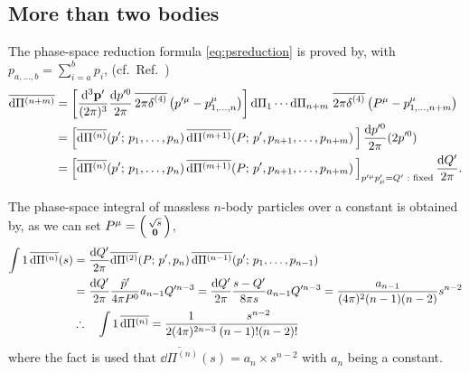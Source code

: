 \documentclass[CheatSheet]{subfiles}
\begin{document}
\subsection{More than two bodies}
The phase-space reduction formula \eqref{eq:psreduction} is proved by, with $p_{a,\dots,b}=\sum_{i=a}^b p_i$, (cf.~Ref.~\cite{Hitoshi233B})
\begin{align*}
  \overline{\dd\Pi^{(n+m)}}%
  &=\left[
    \ddP{p'}\frac{\dd p'^0}{2\pi}\diracdeltabar[4]\left(p'^\mu-p_{1,\dots,n}^\mu\right)
  \right]
  \dd\Pi_1\cdots\dd\Pi_{n+m}\,\diracdeltabar[4]\left(P^\mu-p_{1,\dots,n+m}^\mu\right)
\\ &=    \left[
    \overline{\dd\Pi^{(n)}}(p';\,p_1,\dots,p_n)\,
    \overline{\dd\Pi^{(m+1)}}(P;\,p',p_{n+1},\dots,p_{n+m})\,
  \right]
    \frac{\dd p'^0}{2\pi}(2p'^0)
\\ &=    \left[
    \overline{\dd\Pi^{(n)}}(p';\,p_1,\dots,p_n)\,
    \overline{\dd\Pi^{(m+1)}}(P;\,p',p_{n+1},\dots,p_{n+m})\,
  \right]_{p'^\mu p'_\mu=Q'\text{~:~fixed}}
    \frac{\dd Q'}{2\pi}.
\end{align*}

\pagebreak[3]

The phase-space integral of massless $n$-body particles over a constant is obtained by, as we can set $P^\mu=\left(\begin{smallmatrix}\sqrt{s}\\{\mathbf{0}}\end{smallmatrix}\right)$,
\begin{align}
\int1\,\overline{{\mathrm{d}}\Pi^{(n)}}(s)
&= \frac{{\mathrm{d}} Q'}{2\pi}
  \overline{{\mathrm{d}}\Pi^{(2)}}(P;\,p',p_{n})\,
  \overline{{\mathrm{d}}\Pi^{(n-1)}}(p';\,p_1,\dots,p_{n-1})
\notag\\&= \frac{{\mathrm{d}} Q'}{2\pi}
  \frac{\tilde p'}{4\pi P^0}
  a_{n-1}Q'^{n-3}
= \frac{{\mathrm{d}} Q'}{2\pi}
  \frac{s-Q'}{8\pi{s}}
  a_{n-1}Q'^{n-3}
= \frac{a_{n-1}}{(4\pi)^2(n-1)(n-2)}s^{n-2}
\notag\\&\therefore\quad
\int1\,\overline{{\mathrm{d}}\Pi^{(n)}}=
  \frac{1}{2(4\pi)^{2n-3}}\frac{s^{n-2}}{(n-1)!(n-2)!}
\end{align}
where the fact is used that $\overline{\dd\Pi^{(n)}}(s)=a_n\times s^{n-2}$ with $a_n$ being a constant.
\end{document}
